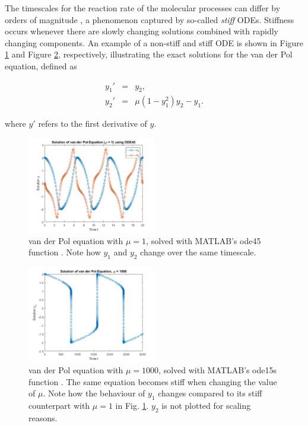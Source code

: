 \documentclass[bsc,frontabs,singlespacing,parskip,deptreport]{infthesis}
\begin{document}
The timescales for the reaction rate of the molecular processes can differ by orders of magnitude \cite{pmid24098642}, a phenomenon captured by so-called \textit{stiff} ODEs. Stiffness occurs whenever there are slowly changing solutions combined with rapidly changing components. An example of a non-stiff and stiff ODE is shown in Figure \ref{fig:vanderpol} and Figure \ref{fig:vanderpol_stiff}, respectively, illustrating the exact solutions for the van der Pol equation, defined as 

\begin{equation}\label{eq:vanderpol}
\begin{array}{lcl} y_{1}' &  = & y_{2}, \\ y_{2}' & = & \mu(1-y_{1}^{2})y_{2}-y_{1}. \end{array}
\end{equation}

where $y'$ refers to the first derivative of $y$.

\begin{figure}[h]
    \centering
        \includegraphics[width=0.5\textwidth]{Images/Other/vanderpol.pdf}
    \caption{van der Pol equation with $\mu=1$, solved with MATLAB's ode45 function \cite{ode45}. Note how $y_{1}$ and $y_{2}$ change over the same timescale.}
    \label{fig:vanderpol}
\end{figure}

\begin{figure}[h]
    \centering
        \includegraphics[width=0.5\textwidth]{Images/Other/vanderpol_stiff.pdf}
    \caption{van der Pol equation with $\mu=1000$, solved with MATLAB's ode15s function \cite{ode15s}. The same equation becomes stiff when changing the value of $\mu$. Note how the behaviour of $y_{1}$ changes compared to its stiff counterpart with $\mu=1$ in Fig. \ref{fig:vanderpol}. $y_{2}$ is not plotted for scaling reasons.}
    \label{fig:vanderpol_stiff}
\end{figure}
\end{document}
